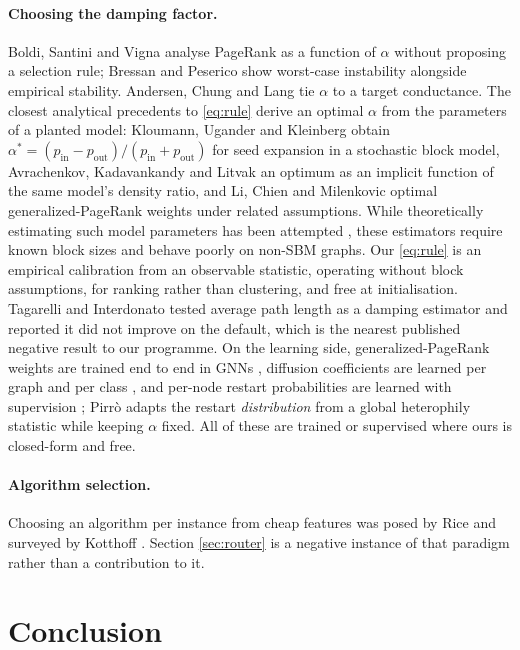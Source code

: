 \documentclass[11pt,a4paper]{article}
\begin{document}
\paragraph{Choosing the damping factor.} Boldi, Santini and Vigna
\cite{boldi05} analyse PageRank as a function of $\alpha$ without proposing a
selection rule; Bressan and Peserico \cite{bressan10} show worst-case
instability alongside empirical stability. Andersen, Chung and Lang \cite{acl06}
tie $\alpha$ to a target conductance. The closest analytical precedents to
\eqref{eq:rule} derive an optimal $\alpha$ from the parameters of a planted
model: Kloumann, Ugander and Kleinberg \cite{kloumann17} obtain
$\alpha^*=(p_{\mathrm{in}}-p_{\mathrm{out}})/(p_{\mathrm{in}}+p_{\mathrm{out}})$
for seed expansion in a stochastic block model, Avrachenkov, Kadavankandy and
Litvak \cite{avrachenkov18} an optimum as an implicit function of the same
model's density ratio, and Li, Chien and Milenkovic \cite{li19gpr} optimal
generalized-PageRank weights under related assumptions. While theoretically
estimating such model parameters has been attempted \cite{allman11}, these
estimators require known block sizes and behave poorly on non-SBM graphs.
Our \eqref{eq:rule} is an empirical calibration from an observable statistic,
operating without block assumptions, for ranking rather than clustering, and
free at initialisation. Tagarelli and Interdonato
\cite{tagarelli14} tested average path length as a damping estimator and
reported it did not improve on the default, which is the nearest published
negative result to our programme. On the learning side, generalized-PageRank
weights are trained end to end in GNNs \cite{gprgnn21}, diffusion
coefficients are learned per graph and per class \cite{berberidis19}, and
per-node restart probabilities are learned with supervision \cite{jung19};
Pirr\`o \cite{pirro25} adapts the restart \emph{distribution} from a global
heterophily statistic while keeping $\alpha$ fixed. All of these are
trained or supervised where ours is closed-form and free.

\paragraph{Algorithm selection.} Choosing an algorithm per instance from cheap
features was posed by Rice \cite{rice76} and surveyed by Kotthoff
\cite{kotthoff14}. Section \ref{sec:router} is a negative instance of that
paradigm rather than a contribution to it.

\section{Conclusion}
\end{document}
